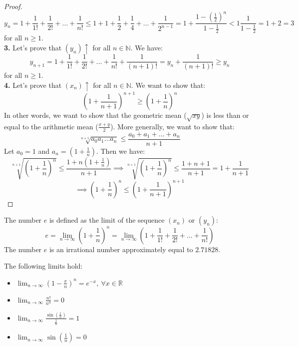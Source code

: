 \begin{proof}
    \[ y_n = 1 + \frac{1}{1!} + \frac{1}{2!} + \ldots + \frac{1}{n!} \leq 1 + 1 + \frac{1}{2} + \frac{1}{4} + \ldots + \frac{1}{2^{n - 1}} = 1 + \frac{1- (\frac{1}{2})^n}{1 - \frac{1}{2}} < 1 \frac{1}{1 - \frac{1}{2}} = 1 + 2 = 3 \]
    for all \( n \geq 1 \). \\
    \textbf{3.} Let's prove that \( (y_n) \uparrow \) for all \( n \in \mathbb{N} \). We have:
    \[
        y_{n + 1} = 1 + \frac{1}{1!} + \frac{1}{2!} + \ldots + \frac{1}{n!} + \frac{1}{(n + 1)!} = y_n + \frac{1}{(n + 1)!} \geq y_n
    \]
    for all \( n \geq 1 \). \\
    \textbf{4.} Let's prove that \( (x_n) \uparrow \) for all \( n \in \mathbb{N} \). We want to show that:
    \[
        \left(1 + \frac{1}{n + 1}\right)^{n + 1} \geq \left(1 + \frac{1}{n}\right)^n
    \]
    In other words, we want to show that the geometric mean ($\sqrt{xy}$) is less than or equal to the arithmetic mean ($\frac{x + y}{2}$). More generally, we want to show that:
    \[
        \sqrt[n + 1]{a_0 a_1 \ldots a_n} \leq \frac{a_0 + a_1 + \ldots + a_n}{n + 1}
    \]
    Let $a_0 = 1$ and $a_n = \left(1 + \frac{1}{n}\right)$. Then we have:
    \[
        \sqrt[n + 1]{\left(1 + \frac{1}{n}\right)^n} \leq \frac{1 + n\left(1 + \frac{1}{n}\right)}{n + 1} \implies \sqrt[n + 1]{\left(1 + \frac{1}{n}\right)^n} \leq \frac{1 + n + 1}{n + 1} = 1 + \frac{1}{n + 1}
    \]
    \[
        \implies \left(1 + \frac{1}{n}\right)^n \leq \left(1 + \frac{1}{n + 1}\right)^{n + 1}
    \]
\end{proof}

\begin{definition}
    The number \( e \) is defined as the limit of the sequence \( (x_n) \) or \( (y_n) \):
    \[
        e = \lim_{n \to \infty} \left(1 + \frac{1}{n}\right)^n = \lim_{n \to \infty} \left(1 + \frac{1}{1!} + \frac{1}{2!} + \ldots + \frac{1}{n!}\right)
    \]
    The number \( e \) is an irrational number approximately equal to \( 2.71828 \).
\end{definition}
The following limits hold:
\begin{itemize}[itemsep=1pt,label=$\circ$]
    \item $\lim_{n \to \infty} \left(1 - \frac{x}{n}\right)^n = e^{-x}, \ \forall x \in \mathbb{R}$
    \item $\lim_{n \to \infty} \frac{n!}{n^n} = 0$
    \item $\lim_{n \to \infty} \frac{\sin(\frac{1}{n})}{\frac{1}{n}} = 1$
    \item $\lim_{n \to \infty} \sin(\frac{1}{n}) = 0$
\end{itemize}

